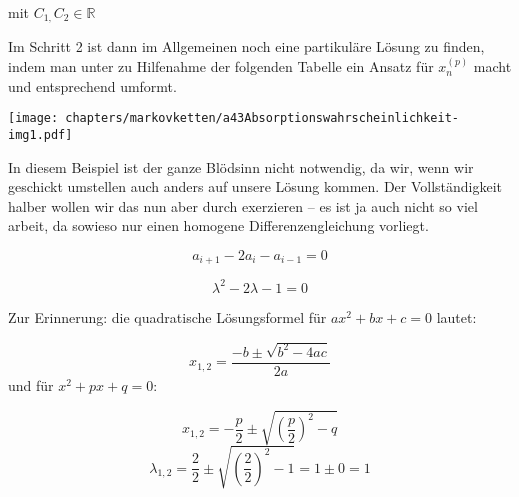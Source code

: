 \begin{uebsp}
{
mit  $C_{1,}C_{2}\in \mathbb{R}$ }



{
Im Schritt 2 ist dann im Allgemeinen noch eine partikul\"are L\"osung zu
finden, indem man unter zu Hilfenahme der folgenden Tabelle ein Ansatz
f\"ur  $x_{n}^{(p)}$ macht und entsprechend umformt.}





\begin{center}
\texttt{[image: chapters/markovketten/a43Absorptionswahrscheinlichkeit-img1.pdf]}
\end{center}
{
In diesem Beispiel ist der ganze Bl\"odsinn nicht notwendig, da wir,
wenn wir geschickt umstellen auch anders auf unsere L\"osung kommen.
Der Vollst\"andigkeit halber wollen wir das nun aber durch exerzieren
-- es ist ja auch nicht so viel arbeit, da sowieso nur einen homogene
Differenzengleichung vorliegt.}



\begin{equation*}
a_{i+1}-2a_{i}-a_{i-1}=0
\end{equation*}




\begin{equation*}
\lambda ^{2}-2\lambda -1=0
\end{equation*}


{
Zur Erinnerung: die quadratische L\"osungsformel f\"ur 
$\mathit{ax}^{2}+\mathit{bx}+c=0$ lautet:}



\begin{equation*}
x_{1,2}=\frac{-b\pm \sqrt{b^{2}-4\mathit{ac}}}{2a}
\end{equation*}
{
und f\"ur  $x^{2}+\mathit{px}+q=0$:}



\begin{equation*}
x_{1,2}=-{\frac{p}{2}}\pm \sqrt{(\frac{p}{2})^{2}-q}
\end{equation*}
\begin{equation*}
\lambda _{1,2}=\frac{2}{2}\pm \sqrt{(\frac{2}{2})^{2}-1}=1\pm 0=1
\end{equation*}


\end{uebsp}
